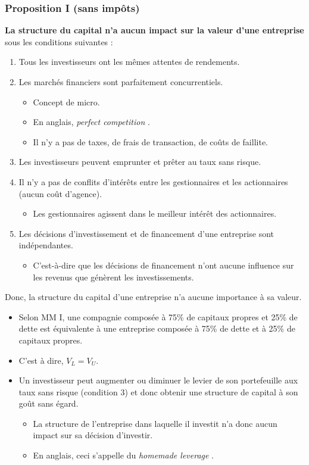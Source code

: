 \documentclass[10pt, french]{article}
\begin{document}
\begin{multicols*}{2}
\subsubsection{Proposition I (sans impôts)}
\textbf{La structure du capital n'a aucun impact sur la valeur d'une entreprise} sous les conditions suivantes :
\begin{definitionNOHFILLpropos}
\begin{enumerate}
	\item	Tous les investisseurs ont les mêmes attentes de rendements.
	\item	Les marchés financiers sont parfaitement concurrentiels.
		\begin{itemize}
		\item	Concept de micro.
		\item	En anglais, \og \textit{perfect competition} \fg{}.
		\item	Il n'y a pas de taxes, de frais de transaction, de coûts de faillite.
		\end{itemize}
	\item	Les investisseurs peuvent emprunter et prêter au taux sans risque.
	\item	Il n'y a pas de conflits d'intérêts entre les gestionnaires et les actionnaires (aucun coût d'agence).
		\begin{itemize}
		\item	Les gestionnaires agissent dans le meilleur intérêt des actionnaires.
		\end{itemize}
	\item	Les décisions d'investissement et de financement d'une entreprise sont indépendantes.
		\begin{itemize}
		\item	C'est-à-dire que les décisions de financement n’ont aucune influence sur les revenus que génèrent les investissements.
		\end{itemize}
\end{enumerate}
\end{definitionNOHFILLpropos}

Donc, la structure du capital d'une entreprise n'a aucune importance à sa valeur. 
\begin{itemize}
	\item	Selon MM I, une compagnie composée à 75\% de capitaux propres et 25\% de dette est équivalente à une entreprise composée à 75\% de dette et à 25\% de capitaux propres. 
	\item	C'est à dire, $V_{L}	=	V_{U}$.
	\item	Un investisseur peut augmenter ou diminuer le levier de son portefeuille aux taux sans risque (condition 3) et donc obtenir une structure de capital à son goût sans égard.
		\begin{itemize}
		\item	La structure de l'entreprise dans laquelle il investit n'a donc aucun impact sur sa décision d'investir.
		\item	En anglais, ceci s'appelle du \og \textit{homemade leverage} \fg{}.
		\end{itemize}
\end{itemize}



\end{multicols*}
\end{document}
